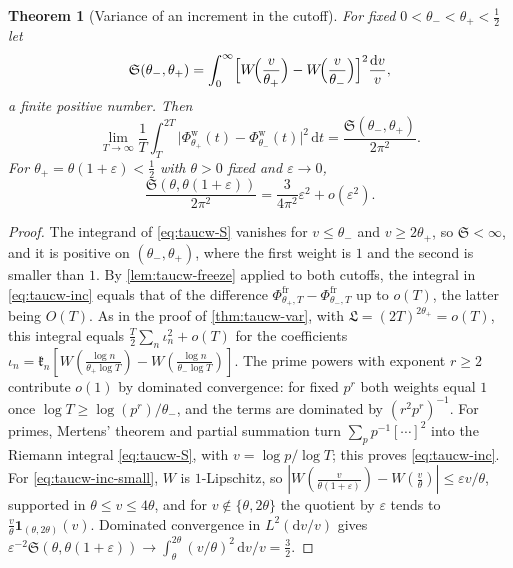 \documentclass[11pt,a4paper]{article}
\numberwithin{equation}{section}
\newtheorem{theorem}{Theorem}[section]
\theoremstyle{definition}
\theoremstyle{remark}
\newcommand{\dd}{\,\mathrm dt}
\begin{document}
\begin{theorem}[Variance of an increment in the cutoff]\label{thm:taucw-inc}
For fixed $0<\theta_-<\theta_+<\frac12$ let
\begin{equation}\label{eq:taucw-S}
\mathfrak S(\theta_-,\theta_+)=\int_0^\infty\Bigl[W\!\Bigl(\frac v{\theta_+}\Bigr)-W\!\Bigl(\frac v{\theta_-}\Bigr)\Bigr]^2\frac{\mathrm dv}v ,
\end{equation}
a finite positive number. Then
\begin{equation}\label{eq:taucw-inc}
\lim_{T\to\infty}\frac1T\int_T^{2T}\bigl|\Phi^{\mathrm w}_{\theta_+}(t)-\Phi^{\mathrm w}_{\theta_-}(t)\bigr|^2\dd=\frac{\mathfrak S(\theta_-,\theta_+)}{2\pi^2}.
\end{equation}
For $\theta_+=\theta(1+\varepsilon)<\frac12$ with $\theta>0$ fixed and $\varepsilon\to0$,
\begin{equation}\label{eq:taucw-inc-small}
\frac{\mathfrak S(\theta,\theta(1+\varepsilon))}{2\pi^2}=\frac3{4\pi^2}\varepsilon^2+o(\varepsilon^2).
\end{equation}
\end{theorem}
\begin{proof}
The integrand of \eqref{eq:taucw-S} vanishes for $v\le\theta_-$ and $v\ge2\theta_+$, so $\mathfrak S<\infty$, and it is positive on $(\theta_-,\theta_+)$, where the first weight is $1$ and the second is smaller than $1$. By \cref{lem:taucw-freeze} applied to both cutoffs, the integral in \eqref{eq:taucw-inc} equals that of the difference $\Phi^{\mathrm{fr}}_{\theta_+,T}-\Phi^{\mathrm{fr}}_{\theta_-,T}$ up to $o(T)$, the latter being $O(T)$. As in the proof of \cref{thm:taucw-var}, with $\mathfrak L=(2T)^{2\theta_+}=o(T)$, this integral equals $\frac T2\sum_n\iota_n^2+o(T)$ for the coefficients $\iota_n=\mathfrak k_n[W(\frac{\log n}{\theta_+\log T})-W(\frac{\log n}{\theta_-\log T})]$. The prime powers with exponent $r\ge2$ contribute $o(1)$ by dominated convergence: for fixed $p^r$ both weights equal $1$ once $\log T\ge\log(p^r)/\theta_-$, and the terms are dominated by $(r^2p^r)^{-1}$. For primes, Mertens' theorem and partial summation turn $\sum_pp^{-1}[\cdots]^2$ into the Riemann integral \eqref{eq:taucw-S}, with $v=\log p/\log T$; this proves \eqref{eq:taucw-inc}.
For \eqref{eq:taucw-inc-small}, $W$ is $1$-Lipschitz, so $|W(\frac v{\theta(1+\varepsilon)})-W(\frac v\theta)|\le\varepsilon v/\theta$, supported in $\theta\le v\le4\theta$, and for $v\notin\{\theta,2\theta\}$ the quotient by $\varepsilon$ tends to $\frac v\theta\mathbf 1_{(\theta,2\theta)}(v)$. Dominated convergence in $L^2(\mathrm dv/v)$ gives $\varepsilon^{-2}\mathfrak S(\theta,\theta(1+\varepsilon))\to\int_\theta^{2\theta}(v/\theta)^2\,\mathrm dv/v=\frac32$.
\end{proof}
\end{document}

